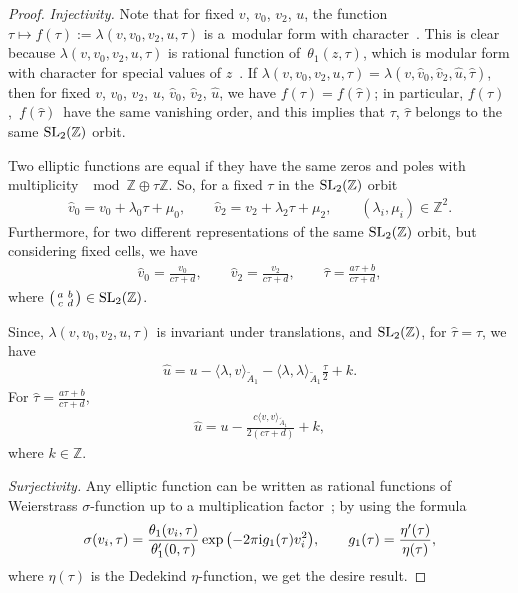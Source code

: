 \documentclass[10pt,a4paper]{amsart}
\numberwithin{equation}{section}
\begin{document}
\begin{proof}
\textit{Injectivity.} Note that for fixed $v$, $v_0$, $v_2$, $u$, the function $\tau\mapsto f(\tau):=\lambda(v,v_0,v_2,u,\tau)$ is a~modu\-lar form with character~\cite{M.EichlerandD.Zagier}. This is clear because $\lambda(v,v_0,v_2,u,\tau)$ is rational function of~$\theta_1(z,\tau)$, which is modular form with character for special values of $z$~\cite{M.EichlerandD.Zagier}.
If $\lambda(v,v_0,v_2,u,\tau) =\lambda(v,\hat v_0,\hat v_2, \hat u, \hat \tau)$, then for fixed $v$, $v_0$, $v_2$, $u$, $\hat v_0$, $\hat v_2$, $\hat u$, we have $f(\tau)=f(\hat \tau)$; in particular, $f(\tau)$,~$f(\hat \tau)$~have the same vanishing order, and this implies that $\tau$, $\hat \tau$ belongs to the same ${\rm SL}_2(\mathbb{Z})$ orbit.

{\samepage
Two elliptic functions are equal if they have the same zeros and poles with multiplicity $\mod \mathbb{Z}\oplus \tau\mathbb{Z}$. So, for a fixed $\tau$ in the ${\rm SL}_2(\mathbb{Z})$ orbit
\begin{gather*}
\hat v_0=v_0+\lambda_0\tau+\mu_0,\qquad
\hat v_2=v_2+\lambda_2\tau+\mu_2,\qquad
(\lambda_i,\mu_i)\in \mathbb{Z}^2.
\end{gather*}
Furthermore, for two different representations of the same ${\rm SL}_2(\mathbb{Z})$ orbit, but considering fixed cells, we have
\begin{gather*}
\hat v_0=\frac{v_0}{c\tau+d},\qquad
\hat v_2=\frac{v_2}{c\tau+d},\qquad
\hat \tau=\frac{a\tau+b}{c\tau+d},
\end{gather*}
where $\left(\begin{smallmatrix}
a & b \\
c & d
\end{smallmatrix}\right)\in {\rm SL}_2(\mathbb{Z})$.

}

Since, $\lambda(v,v_0,v_2,u,\tau)$ is invariant under translations, and ${\rm SL}_2(\mathbb{Z})$, for $\hat\tau=\tau$, we have
\begin{gather*}
\hat u=u-\langle \lambda,v\rangle_{\tilde A_1}-\langle \lambda, \lambda \rangle_{\tilde A_1}\frac{\tau}{2}+k.
\end{gather*}
For $\hat \tau=\frac{a\tau+b}{c\tau+d}$,
\begin{gather*}
\hat u=u-\frac{c\langle v, v \rangle_{\tilde A_1}}{2(c\tau+d)}+k,
\end{gather*}
where $k\in \mathbb{Z}$.

\textit{Surjectivity.}
 Any elliptic function can be written as rational functions of Weierstrass $\sigma$-function up to a multiplication factor~\cite{E.T.WhittakerandG.N.Watson}; by using the formula
\begin{gather*}
\sigma(v_i,\tau)=\frac{\theta_1(v_i,\tau)}{\theta_1^{\prime}(0,\tau)}\exp\big({-}2\pi {\rm i}g_1(\tau)v_i^2\big),\qquad
g_1(\tau)=\frac{\eta^{\prime}(\tau)}{\eta(\tau)},
\end{gather*}
where $\eta(\tau)$ is the Dedekind $\eta$-function, we get the desire result.
\end{proof}
\end{document}
